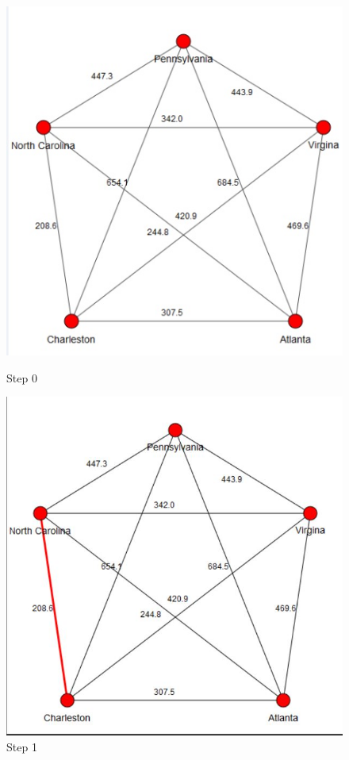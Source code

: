\documentclass[a4paper,11pt]{scrartcl}
\begin{document}
\begin{figure}[h!]
  \centering
  \begin{minipage}[b]{0.4\textwidth}
    \includegraphics[width=\textwidth]{Step0}
    \caption{Step 0}
  \end{minipage}
  \hfill
  \begin{minipage}[b]{0.4\textwidth}
    \includegraphics[width=\textwidth]{Step1}
    \caption{Step 1}
  \end{minipage}
\end{figure}
\end{document}
